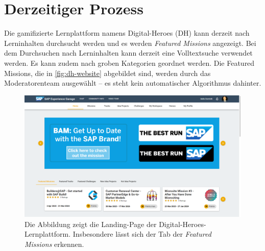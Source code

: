 \chapter{Derzeitiger Prozess}

Die gamifizierte Lernplattform namens Digital-Heroes (DH) kann derzeit nach Lerninhalten durchsucht werden 
und es werden \textit{Featured Missions} angezeigt.
Bei dem Durchsuchen nach Lerninhalten kann derzeit eine Volltextsuche verwendet werden. 
Es kann zudem nach groben Kategorien geordnet werden. 
Die Featured Missions, die in \autoref{fig:dh-website} abgebildet sind, 
werden durch das Moderatorenteam ausgewählt -- es steht kein automatischer 
Algorithmus dahinter.

\begin{figure}
	\centering
	\includegraphics[width=1.\textwidth]{Bilder/dh-website.png} 
	\caption{Die Abbildung zeigt die Landing-Page der Digital-Heroes-Lernplattform. 
    Insbesondere lässt sich der Tab der \textit{Featured Missions} erkennen.}
	\label{fig:dh-website}
\end{figure} 
